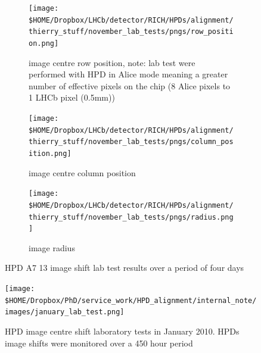 \begin{figure}
	\begin{subfigure}[b]{\textwidth}
		\begin{center}
			\texttt{[image: \$HOME/Dropbox/LHCb/detector/RICH/HPDs/alignment/thierry\_stuff/november\_lab\_tests/pngs/row\_position.png]}
			\caption{image centre row position, note: lab test were performed with HPD in Alice mode meaning a greater number of effective pixels on the chip (8 Alice pixels to 1 LHCb pixel (0.5mm))}
			\label{fig: thierry row}
		\end{center}
	\end{subfigure}
	\begin{subfigure}[b]{\textwidth}
	{
		\begin{center}
			\texttt{[image: \$HOME/Dropbox/LHCb/detector/RICH/HPDs/alignment/thierry\_stuff/november\_lab\_tests/pngs/column\_position.png]}
			\caption{image centre column position}
			\label{fig: thierry col}
		\end{center}
	}
	\end{subfigure}
	\begin{subfigure}[b]{\textwidth}
	{
		\begin{center}
			\texttt{[image: \$HOME/Dropbox/LHCb/detector/RICH/HPDs/alignment/thierry\_stuff/november\_lab\_tests/pngs/radius.png]}
			\caption{image radius}
			\label{fig: thierry radius}
		\end{center}
	}
	\end{subfigure}
	\caption{HPD A7 13 image shift lab test results over a period of four days}
	\label{fig: november lab test}
\end{figure}

\begin{figure}
	\texttt{[image: \$HOME/Dropbox/PhD/service\_work/HPD\_alignment/internal\_note/images/january\_lab\_test.png]}
	\caption{HPD image centre shift laboratory tests in January 2010. HPDs image shifts were monitored over a 450 hour period}
	\label{fig: january lab test}
\end{figure}
